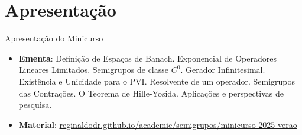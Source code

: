 \section{Apresentação}

\begin{frame}{Apresentação do Minicurso}

\begin{itemize}


\item \textbf{Ementa}:  Definição de Espaços de Banach. Exponencial de Operadores Lineares Limitados. Semigrupos de classe $C^0$.  Gerador Infinitesimal. Existência e Unicidade para o PVI. Resolvente de um operador. Semigrupos das Contrações. O Teorema de Hille-Yosida. Aplicações e perspectivas de pesquisa.

\item \textbf{Material}: \href{https://reginaldodr.github.io/academic/semigrupos/minicurso-2025-verao.html}{reginaldodr.github.io/academic/semigrupos/minicurso-2025-verao}

\begin{center}
\end{center}
\end{itemize}

\end{frame}